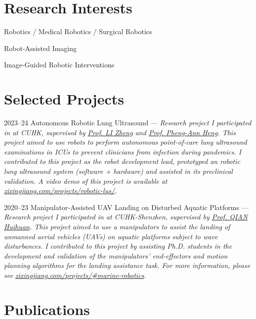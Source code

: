 \documentclass[11pt,letterpaper]{report}
\newcommand{\listitemspace}{0.25em}
\renewenvironment{itemize}
{\begin{list}{}{\setlength{\leftmargin}{0em}
			\setlength{\parskip}{0em}
			\setlength{\itemsep}{\listitemspace}
			\setlength{\parsep}{\listitemspace}}}
	{\end{list}}
\begin{document}
\section*{Research Interests}
\begin{itemize}
	\item Robotics / Medical Robotics / Surgical Robotics
	\item Robot-Assisted Imaging
	\item Image-Guided Robotic Interventions
\end{itemize}
	
\section*{Selected Projects}
\begin{tablist}
	\item[2023--24] \tab Autonomous Robotic Lung Ultrasound --- \textit{Research project I participated in at CUHK, supervised by \href{https://www.surgery.cuhk.edu.hk/profile.asp?alias=zli}{Prof. LI Zheng} and \href{https://www.cse.cuhk.edu.hk/people/faculty/pheng-ann-heng/}{Prof. Pheng-Ann Heng}. This project aimed to use robots to perform autonomous point-of-care lung ultrasound examinations in ICUs to prevent clinicians from infection during pandemics. I contributed to this project as the robot development lead, prototyped an robotic lung ultrasound system (software + hardware) and assisted in its preclinical validation. A video demo of this project is available at \href{https://www.zixingjiang.com/projects/robotic-lus/}{zixingjiang.com/projects/robotic-lus/}.}
	
	\item[2020--23] \tab Manipulator-Assisted UAV Landing on Disturbed Aquatic Platforms ---
	 \textit{Research project I participated in at CUHK-Shenzhen, supervised by \href{https://sse.cuhk.edu.cn/en/faculty/qianhuihuan}{Prof. QIAN Huihuan}. This project aimed to use a manipulators to assist the landing of unmanned aerial vehicles (UAVs) on aquatic platforms subject to wave disturbances. I contributed to this project by assisting Ph.D. students in the development and validation of the manipulators' end-effectors and motion planning algorithms for the landing assistance task. For more information, please see \href{https://www.zixingjiang.com/projects\#marine-robotics}{zixingjiang.com/projects/\#marine-robotics}.}
\end{tablist}
	
\section*{Publications}
\end{document}
